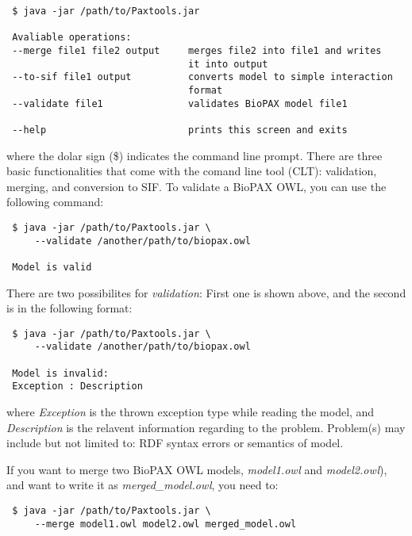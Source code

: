 \documentclass[10pt]{article}
\newenvironment{mylisting}
{\begin{list}{}{\setlength{\leftmargin}{2em}}\item\small\bfseries}
{\end{list}}
\begin{document}
\begin{mylisting}
\begin{verbatim}
 $ java -jar /path/to/Paxtools.jar

 Avaliable operations:
 --merge file1 file2 output     merges file2 into file1 and writes 
                                it into output
 --to-sif file1 output          converts model to simple interaction 
                                format
 --validate file1               validates BioPAX model file1

 --help                         prints this screen and exits 
\end{verbatim}
\end{mylisting}

where the dolar sign ({\$}) indicates the command line prompt. There are three basic functionalities that come with the comand line tool (CLT): validation, merging, and conversion to SIF. To validate a BioPAX OWL, you can use the following command:
\begin{mylisting}
\begin{verbatim}
 $ java -jar /path/to/Paxtools.jar \
     --validate /another/path/to/biopax.owl

 Model is valid
\end{verbatim}
\end{mylisting}

There are two possibilites for \textit{validation}: First one is shown above, and the second is in the following format:
\begin{mylisting}
\begin{verbatim}
 $ java -jar /path/to/Paxtools.jar \
     --validate /another/path/to/biopax.owl

 Model is invalid:
 Exception : Description
\end{verbatim}
\end{mylisting}

where \emph{Exception} is the thrown exception type while reading the model, and \emph{Description} is the relavent information regarding to the problem. Problem(s) may include but not limited to: RDF syntax errors or semantics of model.

If you want to merge two BioPAX OWL models, \emph{model1.owl} and \emph{model2.owl}), and want to write it as \emph{merged\_model.owl}, you need to:
\begin{mylisting}
\begin{verbatim}
 $ java -jar /path/to/Paxtools.jar \
     --merge model1.owl model2.owl merged_model.owl
\end{verbatim}
\end{mylisting}
\end{document}
